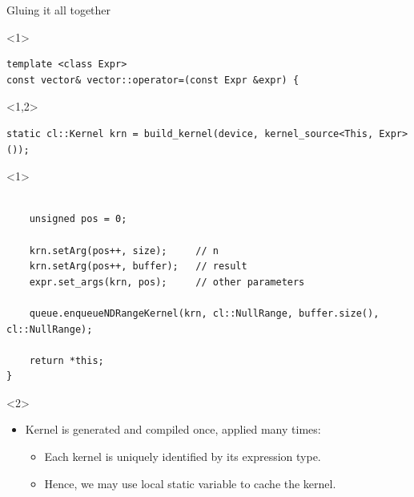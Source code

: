 \documentclass[@BEAMER_OPTIONS@]{beamer}
\begin{document}
\begin{frame}[fragile]{Gluing it all together}
    \begin{exampleblock}{}
        \begin{uncoverenv}<1>
            \begin{lstlisting}
template <class Expr>
const vector& vector::operator=(const Expr &expr) {
            \end{lstlisting}
        \end{uncoverenv}
        \begin{uncoverenv}<1,2>
            \begin{lstlisting}[firstnumber=last]
    static cl::Kernel krn = build_kernel(device, kernel_source<This, Expr>());
            \end{lstlisting}
        \end{uncoverenv}
        \begin{uncoverenv}<1>
            \begin{lstlisting}[firstnumber=last]

    unsigned pos = 0;

    krn.setArg(pos++, size);     // n
    krn.setArg(pos++, buffer);   // result
    expr.set_args(krn, pos);     // other parameters

    queue.enqueueNDRangeKernel(krn, cl::NullRange, buffer.size(), cl::NullRange);

    return *this;
}
            \end{lstlisting}
        \end{uncoverenv}
    \end{exampleblock}
    \begin{uncoverenv}<2>
        \begin{itemize}
            \item Kernel is generated and compiled once, applied many times:
                \begin{itemize}
                    \item Each kernel is uniquely identified by its expression
                        type.
                    \item Hence, we may use local static variable to cache the
                        kernel.
                \end{itemize}
        \end{itemize}
    \end{uncoverenv}
\end{frame}
\end{document}
